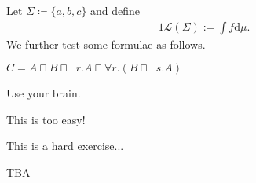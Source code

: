 \documentclass{tudscrexsht} %
\author{Some professor, an assistant}
\date{18.04.2342}
\begin{document}
\begin{exercise}
  Let $\Sigma\coloneqq\{a,b,c\}$ and define
  \begin{alignat*}{1}
    \mathcal{L}(\Sigma):=\int f\mathrm{d}\mu.
  \end{alignat*}
  We further test some formulae as follows.

  $C=A\sqcap B\sqcap\exists r.A\sqcap\forall r.(B\sqcap\exists s.A)$
\end{exercise}

\begin{hint*}
  Use your brain.
\end{hint*}

\begin{hint}
  This is too easy!
\end{hint}

\begin{exercise*}
  This is a hard exercise...
\end{exercise*}

\begin{solution}
  TBA
\end{solution}
\end{document}
